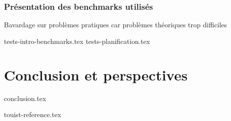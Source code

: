 \documentclass[a4paper,12pt,oneside]{extbook}
\begin{document}
\subsection{Présentation des benchmarks utilisés}
Bavardage sur problèmes pratiques car problèmes théoriques trop difficiles

{tests-intro-benchmarks.tex}
{tests-planification.tex}



\chapter{Conclusion et perspectives}\label{chap:conclusion}
{conclusion.tex}

\appendix

{touist-reference.tex}



\printbibliography
\end{document}

